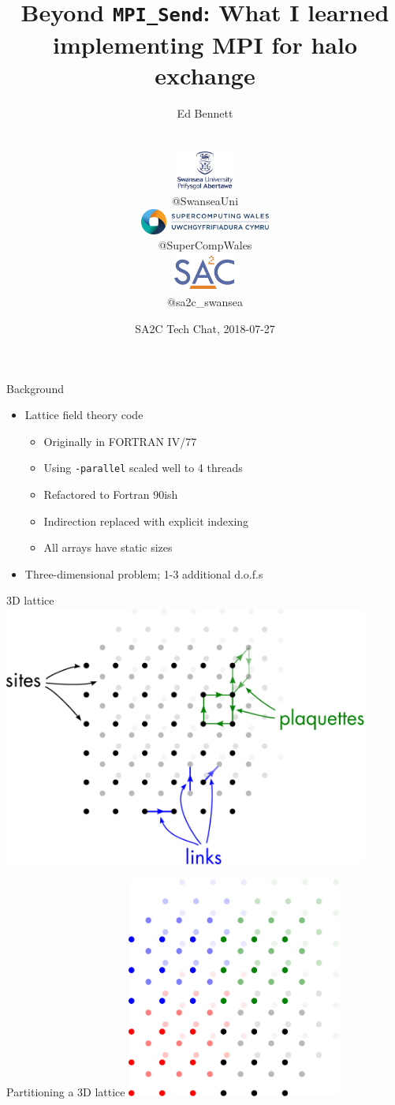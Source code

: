 \documentclass[handout]{beamer}
\title{Beyond \texttt{MPI\_Send}: What I learned implementing MPI for halo exchange}
\author{{\large Ed Bennett}
	\\{\small@QuantumofEd}
	\\\vspace{16pt}
	\hfill
	\parbox{0.22\textwidth}{\centering\includegraphics[height=36pt]{logos/swansea}\\\small @SwanseaUni}
	\parbox{0.44\textwidth}{\centering\includegraphics[height=24pt]{logos/scw}\\\small @SuperCompWales}
	\parbox{0.22\textwidth}{\centering\includegraphics[height=36pt]{logos/sa2c}\\\small @sa2c\_swansea} }
\date{SA2C Tech Chat, 2018-07-27}
\begin{document}
\frame{\titlepage}

\begin{frame}[fragile]{Background}
	\begin{itemize}[<+->]
		\item Lattice field theory code
		\begin{itemize}[<+->]
			\item Originally in FORTRAN IV/77
			\item Using \verb|-parallel| scaled well to 4 threads
			\item Refactored to Fortran 90ish
			\item Indirection replaced with explicit indexing
			\item All arrays have static sizes
		\end{itemize}
		\item Three-dimensional problem; 1-3 additional d.o.f.s
	\end{itemize}
\end{frame}

\begin{frame}{3D lattice}
	\center\includegraphics[width=0.9\textwidth]{figs/lattice-diagram}
\end{frame}

\begin{frame}{Partitioning a 3D lattice}
	\center\includegraphics[width=0.53\textwidth]{figs/lattice-diagram-partition}
\end{frame}
\end{document}
